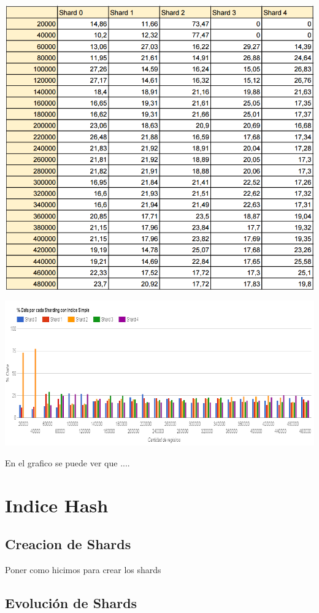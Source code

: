 \documentclass[a4paper, 10pt, twoside]{article}
\begin{document}
\begin{center}
\includegraphics[scale=0.8]{resultado_indice_simple.png}
\end{center}
\includegraphics[scale=0.5]{indice_simple.png}

En el grafico se puede ver que ....
\section{Indice Hash}

\subsection{Creacion de Shards}

Poner como hicimos para crear los shards

\subsection{Evoluci\'on de Shards}
\end{document}
